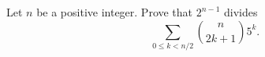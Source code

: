 Let $ n$ be a positive integer. Prove that $ 2^{n-1}$ divides
\[ \sum_{0\leq k < n/2} \binom{n}{2k+1}5^k.\]